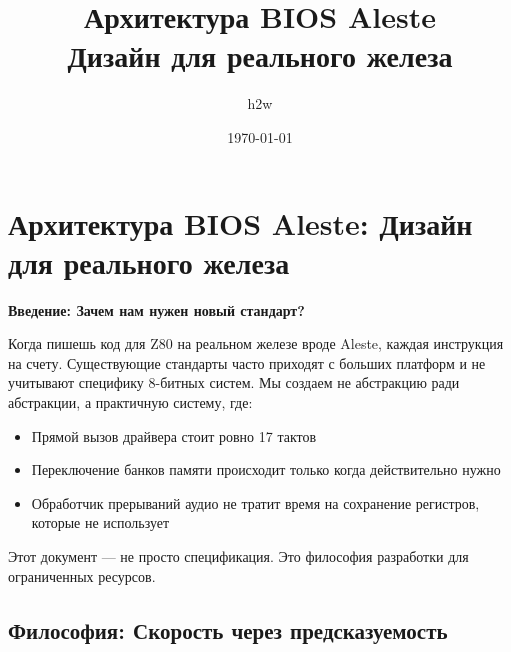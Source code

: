\documentclass[11pt,a4paper]{scrartcl}
\author{h2w}
\date{\today}
\title{Архитектура BIOS Aleste\\\medskip
\large Дизайн для реального железа}
\begin{document}
\maketitle
\tableofcontents

\section{Архитектура BIOS Aleste: Дизайн для реального железа}
\label{sec:org5fc15f3}

\textbf{Введение: Зачем нам нужен новый стандарт?}

Когда пишешь код для Z80 на реальном железе вроде Aleste, каждая инструкция на счету. Существующие стандарты часто приходят с больших платформ и не учитывают специфику 8-битных систем. Мы создаем не абстракцию ради абстракции, а практичную систему, где:

\begin{itemize}
\item Прямой вызов драйвера стоит ровно 17 тактов
\item Переключение банков памяти происходит только когда действительно нужно
\item Обработчик прерываний аудио не тратит время на сохранение регистров, которые не использует
\end{itemize}

Этот документ — не просто спецификация. Это философия разработки для ограниченных ресурсов.
\subsection{Философия: Скорость через предсказуемость}
\label{sec:org691ac27}
\end{document}
